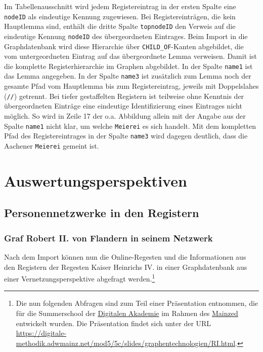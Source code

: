 \documentclass[ngerman,]{scrreprt}
\begin{document}
Im Tabellenausschnitt wird jedem Registereintrag in der ersten Spalte eine \texttt{nodeID} als eindeutige Kennung zugewiesen. Bei Registereinträgen, die kein Hauptlemma sind, enthält die dritte Spalte \texttt{topnodeID} den Verweis auf die eindeutige Kennung \texttt{nodeID} des übergeordneten Eintrages. Beim Import in die Graphdatenbank wird diese Hierarchie über \texttt{CHILD\_OF}-Kanten abgebildet, die vom untergeordneten Eintrag auf das übergeordnete Lemma verweisen. Damit ist die komplette Registerhierarchie im Graphen abgebildet. In der Spalte \texttt{name1} ist das Lemma angegeben. In der Spalte \texttt{name3} ist zusätzlich zum Lemma noch der gesamte Pfad vom Hauptlemma bis zum Registereintrag, jeweils mit Doppelslahes (\texttt{//}) getrennt. Bei tiefer gestaffelten Registern ist teilweise ohne Kenntnis der übergeordneten Einträge eine eindeutige Identifizierung eines Eintrages nicht möglich. So wird in Zeile 17 der o.a. Abbildung allein mit der Angabe aus der Spalte \texttt{name1} nicht klar, um welche \texttt{Meierei} es sich handelt. Mit dem kompletten Pfad des Registereintrages in der Spalte \texttt{name3} wird dagegen deutlich, dass die Aachener \texttt{Meierei} gemeint ist.

\section{Auswertungsperspektiven}\label{auswertungsperspektiven}

\subsection{Personennetzwerke in den Registern}\label{personennetzwerke-in-den-registern}

\subsubsection{Graf Robert II. von Flandern in seinem Netzwerk}\label{graf-robert-ii.-von-flandern-in-seinem-netzwerk}

Nach dem Import können nun die Online-Regesten und die Informationen aus den Registern der Regesten Kaiser Heinrichs IV. in einer Graphdatenbank aus einer Vernetzungsperspektive abgefragt werden.\footnote{Die nun folgenden Abfragen sind zum Teil einer Präsentation entnommen, die für die Summerschool der \href{https://www.digitale-akademie.de}{Digitalen Akademie} im Rahmen des \href{https://www.mainzed.org/de}{Mainzed} entwickelt wurden. Die Präsentation findet sich unter der URL \url{https://digitale-methodik.adwmainz.net/mod5/5c/slides/graphentechnologien/RI.html}.}
\end{document}
